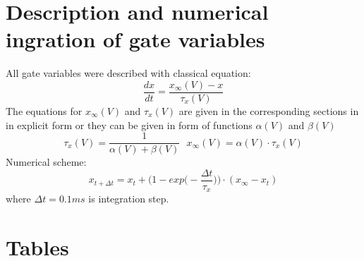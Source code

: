\documentclass[a4paper,12pt]{article}
\begin{document}
\section{Description and numerical ingration of gate variables}
All gate variables were described with classical equation: 
\begin{equation}
\frac{dx}{dt} = \frac{x_{\infty}(V) - x}{\tau_x(V)}
\end{equation}
The equations for $x_{\infty}(V)$ and $\tau_x(V)$ are given in the corresponding sections in in explicit form or they can be given in form of functions  $\alpha(V)$ and $\beta(V)$
\begin{equation}
\tau_x(V) =  \frac{1}{\alpha(V) + \beta(V)} \ \ \ 
x_{\infty}(V) = \alpha(V) \cdot \tau_x(V)
\end{equation}
Numerical scheme:
\begin{equation}
x_{t + \Delta t} = x_t+\Big(1 - exp \Big(-\frac{\Delta t}{\tau_x} \Big) \Big)\cdot (x_{\infty}-x_t) 
\end{equation}
where $\Delta t = 0.1 ms$ is integration step.

\section{Tables}









\end{document}
